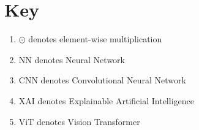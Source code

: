 \chapter*{Key}

\begin{enumerate}
    \item $\odot$ denotes element-wise multiplication
    \item NN denotes Neural Network
    \item CNN denotes Convolutional Neural Network
    \item XAI denotes Explainable Artificial Intelligence
    \item ViT denotes Vision Transformer
\end{enumerate}